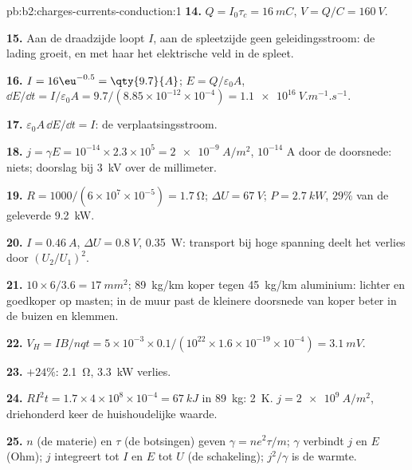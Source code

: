 \begin{solution}{pb:b2:charges-currents-conduction:1}
\textbf{14.} $Q = I_0\tau_c = \qty{16}{mC}$, $V = Q/C = \qty{160}{V}$.

\textbf{15.} Aan de draadzijde loopt $I$, aan de spleetzijde geen
geleidingsstroom: de lading groeit, en met haar het elektrische veld in de
spleet.

\textbf{16.} $I = 16\eu^{-0.5} = \qty{9.7}{A}$; $E = Q/\varepsilon_0A$,
$\dd E/\dd t = I/\varepsilon_0A
= 9.7/(8.85 \times 10^{-12} \times 10^{-4}) = \qty{1.1e16}{V.m^{-1}.s^{-1}}$.

\textbf{17.} $\varepsilon_0A\,\dd E/\dd t = I$: de verplaatsingsstroom.

\textbf{18.}
$j = \gamma E = 10^{-14} \times 2.3 \times 10^5 = \qty{2e-9}{A/m^2}$,
$10^{-14}$ A door de doorsnede: niets; doorslag bij \qty{3}{kV} over de
millimeter.

\textbf{19.} $R = 1000/(6 \times 10^7 \times 10^{-5}) = \qty{1.7}{\ohm}$;
$\Delta U = \qty{67}{V}$; $P =
\qty{2.7}{kW}$, $29\%$ van de geleverde
\qty{9.2}{kW}.

\textbf{20.} $I = \qty{0.46}{A}$, $\Delta U = \qty{0.8}{V}$, \qty{0.35}{W}:
transport bij hoge spanning deelt het verlies door $(U_2/U_1)^2$.

\textbf{21.} $10 \times 6/3.6 = \qty{17}{mm^2}$; \qty{89}{kg/km} koper tegen
\qty{45}{kg/km} aluminium: lichter en goedkoper op masten; in de muur past
de kleinere doorsnede van koper beter in de buizen en klemmen.

\textbf{22.}
$V_H = IB/nqt = 5 \times 10^{-3} \times 0.1/(10^{22} \times 1.6 \times 10^{-19} \times 10^{-4}) =
\qty{3.1}{mV}$.

\textbf{23.} $+24\%$: \qty{2.1}{\ohm}, \qty{3.3}{kW} verlies.

\textbf{24.}
$RI^2t = 1.7 \times 4 \times 10^8 \times 10^{-4} = \qty{67}{kJ}$ in
\qty{89}{kg}: \qty{2}{K}. $j = \qty{2e9}{A/m^2}$, driehonderd keer de
huishoudelijke waarde.

\textbf{25.} $n$ (de materie) en $\tau$ (de botsingen) geven
$\gamma = ne^2\tau/m$; $\gamma$ verbindt $j$ en $E$ (Ohm); $j$ integreert
tot $I$ en $E$ tot $U$ (de schakeling); $j^2/\gamma$ is de warmte.
\end{solution}
